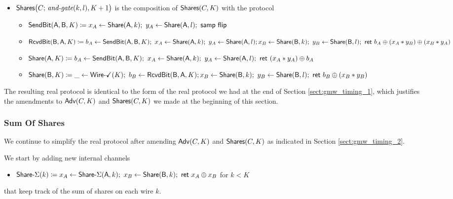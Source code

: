 \begin{itemize}
\item $\mathsf{Shares}\big(C; \, \textit{and-gate}(k,l),K+1\big)$ is the composition of $\mathsf{Shares}(C,K)$ with the protocol
\begin{itemize}
\item $\SendBit(\A,\B,K) \coloneqq x_A \leftarrow \Share(\A,k); \ y_A \leftarrow \Share(\A,l); \ \samp{\flip}$
\item $\mathsf{RcvdBit}(\mathsf{B},\mathsf{A},K) \coloneqq b_A \leftarrow \mathsf{SendBit}(\mathsf{A},\mathsf{B},K); \ x_A \leftarrow \mathsf{Share}(\mathsf{A},k); \ y_A \leftarrow \mathsf{Share}(\mathsf{A},l); \\ x_B \leftarrow \mathsf{Share}(\mathsf{B},k); \ y_B \leftarrow \mathsf{Share}(\mathsf{B},l); \ \mathsf{ret} \ b_A \oplus (x_A * y_B) \oplus (x_B * y_A)$
\item $\mathsf{Share}(\mathsf{A},K) \coloneqq b_A \leftarrow \mathsf{SendBit}(\mathsf{A},\mathsf{B},K); \ x_A \leftarrow \mathsf{Share}(\mathsf{A},k); \ y_A \leftarrow \mathsf{Share}(\mathsf{A},l); \ \mathsf{ret} \ (x_A * y_A) \oplus b_A$
\item $\mathsf{Share}(\mathsf{B},K) \coloneqq \_ \leftarrow \mathsf{Wire}\textsf{-}\checkmark(K); \ b_B \leftarrow \mathsf{RcvdBit}(\mathsf{B},\mathsf{A},K); \\ x_B \leftarrow \mathsf{Share}(\mathsf{B},k); \ y_B \leftarrow \mathsf{Share}(\mathsf{B},l); \ \mathsf{ret} \ b_B \oplus (x_B * y_B)$
\end{itemize}
\end{itemize}

\noindent The resulting real protocol is identical to the form of the real protocol we had at the end of Section \ref{sect:gmw_timing_1}, which justifies the amendments to $\mathsf{Adv}(C,K)$ and $\mathsf{Shares}(C,K)$ we made at the beginning of this section.

\subsubsection{Sum Of Shares}
We continue to simplify the real protocol after amending $\mathsf{Adv}(C,K)$ and $\mathsf{Shares}(C,K)$ as indicated in Section \ref{sect:gmw_timing_2}.\medskip

\noindent We start by adding new internal channels
\begin{itemize}
\item $\mathsf{Share}\textsf{-}\Sigma(k) \coloneqq x_A \leftarrow \mathsf{Share}\textsf{-}\Sigma(\mathsf{A},k); \ x_B\leftarrow \mathsf{Share}(\mathsf{B},k); \ \mathsf{ret} \ x_A \oplus x_B$ for $k < K$
\end{itemize}
that keep track of the sum of shares on each wire $k$.\medskip

